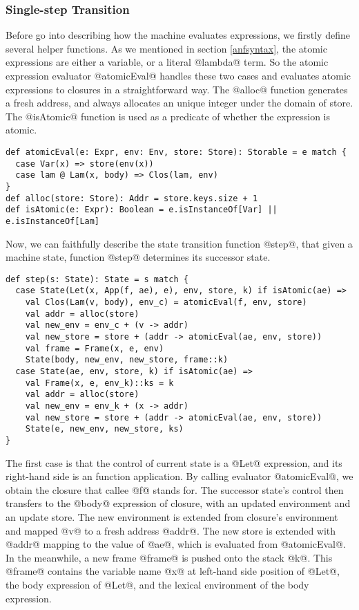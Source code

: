 \documentclass[acmsmall,review,anonymous]{acmart}\settopmatter{printfolios=true,printccs=false,printacmref=false}
\begin{document}
\subsubsection{Single-step Transition}
Before go into describing how the machine evaluates expressions, we firstly define several helper functions.
As we mentioned in section \ref{anfsyntax}, the atomic expressions are either a variable, or
a literal @lambda@ term. So the atomic expression evaluator @atomicEval@ handles these two
cases and evaluates atomic expressions to closures in a straightforward way.
The @alloc@ function generates a fresh address, and always allocates an unique integer under the domain
of store.
The @isAtomic@ function is used as a predicate of whether the expression is atomic.

\begin{lstlisting}
def atomicEval(e: Expr, env: Env, store: Store): Storable = e match {
  case Var(x) => store(env(x))
  case lam @ Lam(x, body) => Clos(lam, env)
}
def alloc(store: Store): Addr = store.keys.size + 1
def isAtomic(e: Expr): Boolean = e.isInstanceOf[Var] || e.isInstanceOf[Lam]
\end{lstlisting}

Now, we can faithfully describe the state transition function @step@,
that given a machine state, function @step@ determines its successor state.

\begin{lstlisting}
def step(s: State): State = s match {
  case State(Let(x, App(f, ae), e), env, store, k) if isAtomic(ae) =>
    val Clos(Lam(v, body), env_c) = atomicEval(f, env, store)
    val addr = alloc(store)
    val new_env = env_c + (v -> addr)
    val new_store = store + (addr -> atomicEval(ae, env, store))
    val frame = Frame(x, e, env)
    State(body, new_env, new_store, frame::k)
  case State(ae, env, store, k) if isAtomic(ae) =>
    val Frame(x, e, env_k)::ks = k
    val addr = alloc(store)
    val new_env = env_k + (x -> addr)
    val new_store = store + (addr -> atomicEval(ae, env, store))
    State(e, new_env, new_store, ks)
}
\end{lstlisting}

The first case is that the control of current state is a @Let@ expression,
and its right-hand side is an function application.
By calling evaluator @atomicEval@, we obtain the closure that callee @f@ stands for.
The successor state's control then transfers to the @body@ expression of closure,
with an updated environment and an update store. The new environment is extended
from closure's environment and mapped @v@ to a fresh address @addr@.
The new store is extended with @addr@ mapping to the value of @ae@,
which is evaluated from @atomicEval@.
In the meanwhile, a new frame @frame@ is pushed onto the stack @k@.
This @frame@ contains the variable name @x@ at left-hand side position of @Let@,
the body expression of @Let@, and the lexical environment of the body expression.
\end{document}
